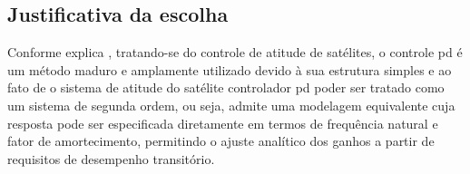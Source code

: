 \subsection{Justificativa da escolha}

Conforme explica \cite{qi2022variable}, tratando-se do controle de atitude de satélites, o controle \gls{pd} é um método maduro e amplamente utilizado devido à sua estrutura simples e ao fato de o sistema de atitude do satélite controlador \gls{pd} poder ser tratado como um sistema de segunda ordem, ou seja, admite uma modelagem equivalente cuja resposta pode ser especificada diretamente em termos de frequência natural e fator de amortecimento, permitindo o ajuste analítico dos ganhos a partir de requisitos de desempenho transitório.